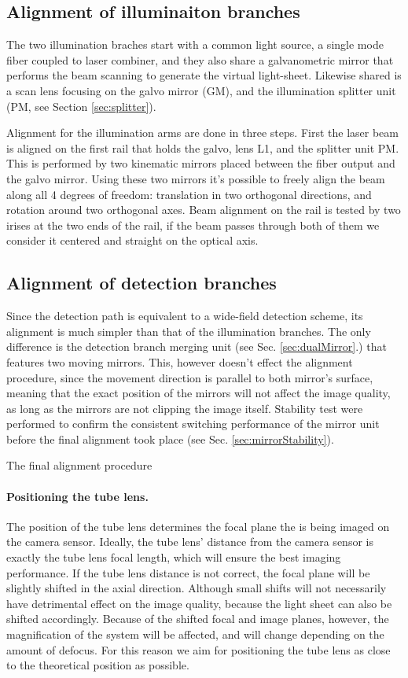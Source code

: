 \documentclass{diploma_style}
\begin{document}
\subsection{Alignment of illuminaiton branches}
The two illumination braches start with a common light source, a single mode fiber coupled to laser combiner, and they also share a galvanometric mirror that performs the beam scanning to generate the virtual light-sheet. Likewise shared is a scan lens focusing on the galvo mirror (GM), and the illumination splitter unit (PM, see Section \ref{sec:splitter}).

Alignment for the illumination arms are done in three steps. First the laser beam is aligned on the first rail that holds the galvo, lens L1, and the splitter unit PM. This is performed by two kinematic mirrors placed between the fiber output and the galvo mirror. Using these two mirrors it's possible to freely align the beam along all 4 degrees of freedom: translation in two orthogonal directions, and rotation around two orthogonal axes. Beam alignment on the rail is tested by two irises at the two ends of the rail, if the beam passes through both of them we consider it centered and straight on the optical axis.



\subsection{Alignment of detection branches}
Since the detection path is equivalent to a wide-field detection scheme, its alignment is much simpler than that of the illumination branches. The only difference is the detection branch merging unit (see Sec. \ref{sec:dualMirror}.) that features two moving mirrors. This, however doesn't effect the alignment procedure, since the movement direction is parallel to both mirror's surface, meaning that the exact position of the mirrors will not affect the image quality, as long as the mirrors are not clipping the image itself. Stability test were performed to confirm the consistent switching performance of the mirror unit before the final alignment took place (see Sec. \ref{sec:mirrorStability}).

The final alignment procedure 

\paragraph{Positioning the tube lens.}
The position of the tube lens determines the focal plane the is being imaged on the camera sensor. Ideally, the tube lens' distance from the camera sensor is exactly the tube lens focal length, which will ensure the best imaging performance. If the tube lens distance is not correct, the focal plane will be slightly shifted in the axial direction. Although small shifts will not necessarily have detrimental effect on the image quality, because the light sheet can also be shifted accordingly. Because of the shifted focal and image planes, however, the magnification of the system will be affected, and will change depending on the amount of defocus. For this reason we aim for positioning the tube lens as close to the theoretical position as possible.
\end{document}
